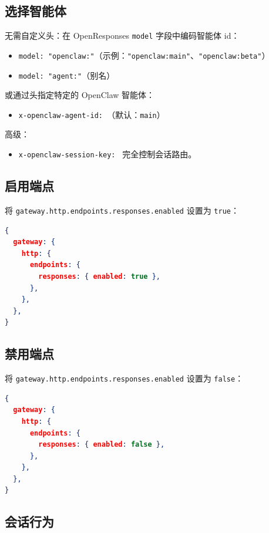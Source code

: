 \subsection{选择智能体}


无需自定义头：在 OpenResponses \texttt{model} 字段中编码智能体 id：

\begin{itemize}
  \item \texttt{model: "openclaw:"}（示例：\texttt{"openclaw:main"}、\texttt{"openclaw:beta"}）
  \item \texttt{model: "agent:"}（别名）
\end{itemize}


或通过头指定特定的 OpenClaw 智能体：

\begin{itemize}
  \item \texttt{x-openclaw-agent-id: }（默认：\texttt{main}）
\end{itemize}


高级：

\begin{itemize}
  \item \texttt{x-openclaw-session-key: } 完全控制会话路由。
\end{itemize}


\subsection{启用端点}


将 \texttt{gateway.http.endpoints.responses.enabled} 设置为 \texttt{true}：

\begin{lstlisting}[language=json]
{
  gateway: {
    http: {
      endpoints: {
        responses: { enabled: true },
      },
    },
  },
}
\end{lstlisting}


\subsection{禁用端点}


将 \texttt{gateway.http.endpoints.responses.enabled} 设置为 \texttt{false}：

\begin{lstlisting}[language=json]
{
  gateway: {
    http: {
      endpoints: {
        responses: { enabled: false },
      },
    },
  },
}
\end{lstlisting}


\subsection{会话行为}


